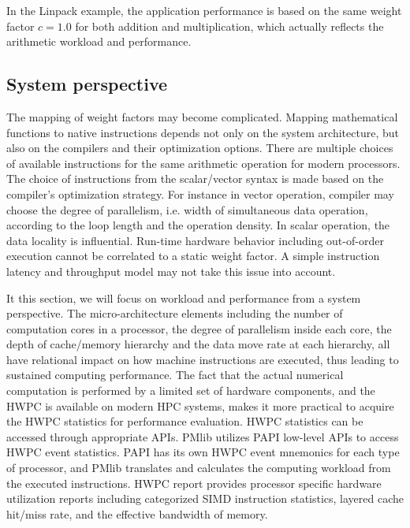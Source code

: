 \documentclass[conference]{IEEEtran}
\begin{document}
In the Linpack example, the application performance is based on
the same weight factor $ c = 1.0 $ 
for both addition and multiplication, which actually reflects the
arithmetic workload and performance.


\subsection{System perspective}
\label{subsection:system-perspective}
%
%
The mapping of weight factors may become complicated.
Mapping mathematical functions to native instructions
depends not only on the system architecture, but also on the compilers
and their optimization options.
There are multiple choices of available instructions for the same
arithmetic operation for modern processors.
The choice of instructions from the scalar/vector syntax is made based on the
compiler's optimization strategy.
For instance in vector operation, compiler may choose
the degree of parallelism, i.e. width of simultaneous data operation,
according to the loop length and the operation density.
In scalar operation, the data locality is influential.
Run-time hardware behavior including out-of-order execution cannot
be correlated to a static weight factor.
A simple instruction latency and throughput model may not take this issue
into account.

It this section, we will focus on workload and performance from
a system perspective.
The micro-architecture elements including the number of computation cores
in a processor, the degree of parallelism inside each core,
the depth of cache/memory hierarchy and the data move rate at each hierarchy,
all have relational impact on how machine instructions are executed,
thus leading to sustained computing performance.
The fact that the actual numerical computation is performed by a
limited set of hardware components, and the HWPC is available
on modern HPC systems, makes it more practical to acquire the HWPC statistics
for performance evaluation.
HWPC statistics can be accessed through appropriate APIs.
PMlib utilizes PAPI low-level APIs to access HWPC event statistics.
PAPI has its own HWPC event mnemonics for each type of processor,
and PMlib translates and
calculates the computing workload from the executed instructions.
HWPC report provides processor specific hardware utilization reports
including categorized SIMD instruction statistics, layered cache
hit/miss rate, and the effective bandwidth of memory.
\end{document}
